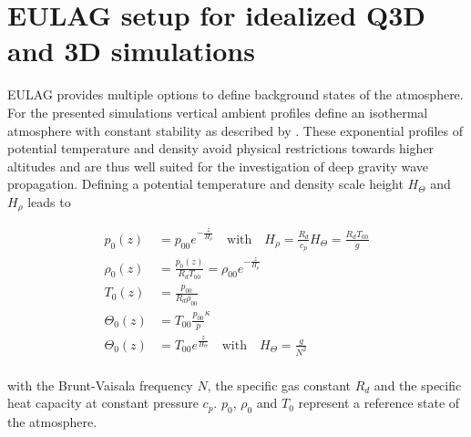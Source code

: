 \section{EULAG setup for idealized Q3D and 3D simulations}

EULAG provides multiple options to define background states of the atmosphere. For the presented simulations vertical ambient profiles define an isothermal atmosphere with constant stability as described by \textcite{bacmeister_breakdown_1989}. These exponential profiles of potential temperature and density avoid physical restrictions towards higher altitudes and are thus well suited for the investigation of deep gravity wave propagation. Defining a potential temperature and density scale height $H_{\Theta}$ and $H_{\rho}$ leads to

\begin{equation}
\begin{aligned}
    p_0(z) &= p_{00} e^{-\frac{z}{H_{\rho}}} \quad \textrm{with} \quad H_{\rho} = \frac{R_d}{c_p} H_{\Theta} = \frac{R_d T_{00}}{g} \\
    \rho_0(z) &= \frac{p_0(z)}{R_d T_{00}} = \rho_{00} e^{-\frac{z}{H_{\rho}}} \\
    T_0(z) &= \frac{p_{00}}{R_d \rho_{00}} \\
    \Theta_0(z) &= T_{00} \frac{p_{00}}{p}^{\kappa} \\
    \Theta_0(z) &= T_{00} e^{\frac{z}{H_{\Theta}}} \quad \textrm{with} \quad H_{\Theta} = \frac{g}{N^2} \\
    \label{equ:ambient-Profiles}
\end{aligned}
\end{equation}

with the Brunt-Vaisala frequency $N$, the specific gas constant $R_d$ and the specific heat capacity at constant pressure $c_p$. $p_0$, $\rho_0$ and $T_0$ represent a reference state of the atmosphere.

